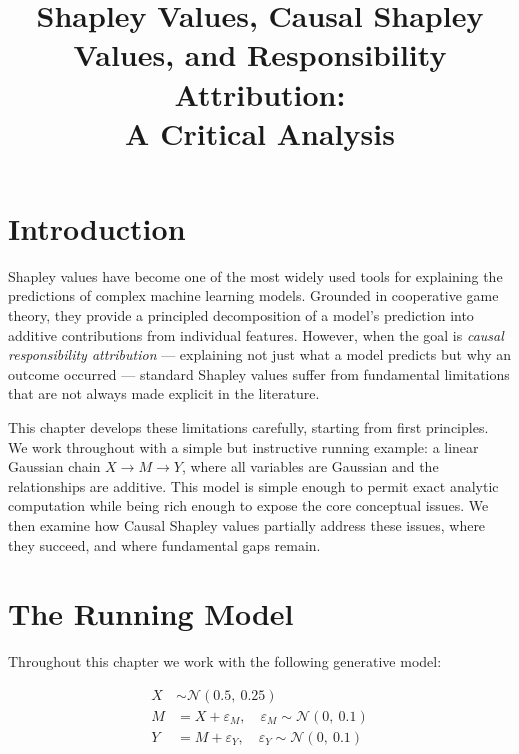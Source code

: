 \documentclass[12pt]{article}
\title{Shapley Values, Causal Shapley Values, and Responsibility Attribution:\\
A Critical Analysis}
\date{}
\begin{document}
\maketitle

\tableofcontents
\newpage

\section{Introduction}

Shapley values have become one of the most widely used tools for explaining the predictions
of complex machine learning models. Grounded in cooperative game theory, they provide a
principled decomposition of a model's prediction into additive contributions from individual
features. However, when the goal is \emph{causal responsibility attribution} --- explaining
not just what a model predicts but why an outcome occurred --- standard Shapley values
suffer from fundamental limitations that are not always made explicit in the literature.

This chapter develops these limitations carefully, starting from first principles. We work
throughout with a simple but instructive running example: a linear Gaussian chain
$X \to M \to Y$, where all variables are Gaussian and the relationships are additive.
This model is simple enough to permit exact analytic computation while being rich enough
to expose the core conceptual issues. We then examine how Causal Shapley values
\citep{heskes2020causal} partially address these issues, where they succeed, and where
fundamental gaps remain.

\section{The Running Model}

Throughout this chapter we work with the following generative model:

\begin{align}
X &\sim \mathcal{N}(0.5,\ 0.25) \label{eq:X}\\
M &= X + \varepsilon_M, \quad \varepsilon_M \sim \mathcal{N}(0,\ 0.1) \label{eq:M}\\
Y &= M + \varepsilon_Y, \quad \varepsilon_Y \sim \mathcal{N}(0,\ 0.1) \label{eq:Y}
\end{align}
\end{document}
